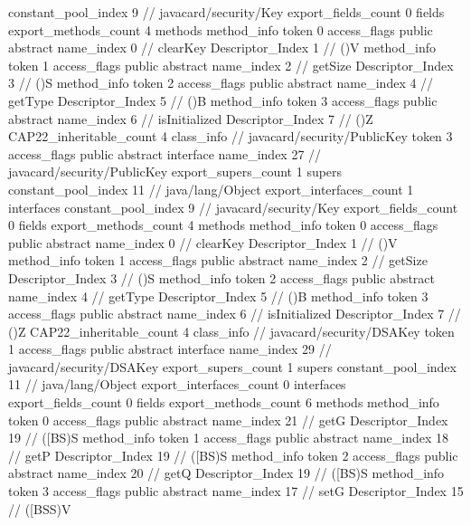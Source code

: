 {{{{				constant_pool_index	9		// javacard/security/Key
			}
			export_fields_count	0
			fields {
			}
			export_methods_count	4
			methods {
				method_info {
					token	0
					access_flags	public abstract
					name_index	0		// clearKey
					Descriptor_Index	1		// ()V
				}
				method_info {
					token	1
					access_flags	public abstract
					name_index	2		// getSize
					Descriptor_Index	3		// ()S
				}
				method_info {
					token	2
					access_flags	public abstract
					name_index	4		// getType
					Descriptor_Index	5		// ()B
				}
				method_info {
					token	3
					access_flags	public abstract
					name_index	6		// isInitialized
					Descriptor_Index	7		// ()Z
				}
			}
			CAP22_inheritable_count	4
		}
		class_info {		// javacard/security/PublicKey
			token	3
			access_flags	public abstract interface
			name_index	27		// javacard/security/PublicKey
			export_supers_count	1
			supers {
				constant_pool_index	11		// java/lang/Object
			}
			export_interfaces_count	1
			interfaces {
				constant_pool_index	9		// javacard/security/Key
			}
			export_fields_count	0
			fields {
			}
			export_methods_count	4
			methods {
				method_info {
					token	0
					access_flags	public abstract
					name_index	0		// clearKey
					Descriptor_Index	1		// ()V
				}
				method_info {
					token	1
					access_flags	public abstract
					name_index	2		// getSize
					Descriptor_Index	3		// ()S
				}
				method_info {
					token	2
					access_flags	public abstract
					name_index	4		// getType
					Descriptor_Index	5		// ()B
				}
				method_info {
					token	3
					access_flags	public abstract
					name_index	6		// isInitialized
					Descriptor_Index	7		// ()Z
				}
			}
			CAP22_inheritable_count	4
		}
		class_info {		// javacard/security/DSAKey
			token	1
			access_flags	public abstract interface
			name_index	29		// javacard/security/DSAKey
			export_supers_count	1
			supers {
				constant_pool_index	11		// java/lang/Object
			}
			export_interfaces_count	0
			interfaces {
			}
			export_fields_count	0
			fields {
			}
			export_methods_count	6
			methods {
				method_info {
					token	0
					access_flags	public abstract
					name_index	21		// getG
					Descriptor_Index	19		// ([BS)S
				}
				method_info {
					token	1
					access_flags	public abstract
					name_index	18		// getP
					Descriptor_Index	19		// ([BS)S
				}
				method_info {
					token	2
					access_flags	public abstract
					name_index	20		// getQ
					Descriptor_Index	19		// ([BS)S
				}
				method_info {
					token	3
					access_flags	public abstract
					name_index	17		// setG
					Descriptor_Index	15		// ([BSS)V
}}}}}
